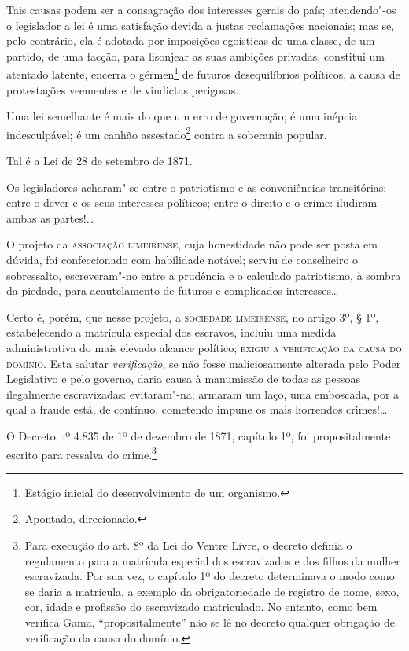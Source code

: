 Tais causas podem ser a consagração dos interesses gerais do país;
atendendo"-os o legislador a lei é uma satisfação devida a justas
reclamações nacionais; mas se, pelo contrário, ela é adotada por
imposições egoísticas de uma classe, de um partido, de uma facção, para
lisonjear as suas ambições privadas, constitui um atentado latente,
encerra o gérmen\footnote{Estágio inicial do desenvolvimento de um
  organismo.} de futuros desequilíbrios políticos, a causa de
protestações veementes e de vindictas perigosas.

Uma lei semelhante é mais do que um erro de governação; é uma inépcia
indesculpável; é um canhão assestado\footnote{Apontado, direcionado.}
contra a soberania popular.

Tal é a Lei de 28 de setembro de 1871.

Os legisladores acharam"-se entre o patriotismo e as conveniências
transitórias; entre o dever e os seus interesses políticos; entre o
direito e o crime: iludiram ambas as partes!\ldots{}

O projeto da \textsc{associação limeirense}, cuja honestidade não pode ser posta
em dúvida, foi confeccionado com habilidade notável; serviu de
conselheiro o sobressalto, escreveram"-no entre a prudência e o calculado
patriotismo, à sombra da piedade, para acautelamento de futuros e
complicados interesses\ldots{}

Certo é, porém, que nesse projeto, a \textsc{sociedade limeirense}, no artigo 3º,
§ 1º, estabelecendo a matrícula especial dos escravos, incluiu uma
medida administrativa do mais elevado alcance político; \textsc{exigiu a
verificação da causa do domínio}. Esta salutar \emph{verificação}, se não
fosse maliciosamente alterada pelo Poder Legislativo e pelo governo,
daria causa à manumissão de todas as pessoas ilegalmente escravizadas:
evitaram"-na; armaram um laço, uma emboscada, por a qual a fraude está,
de contínuo, cometendo impune os mais horrendos crimes!\ldots{}

O Decreto nº 4.835 de 1º de dezembro de 1871, capítulo 1º, foi
propositalmente escrito para ressalva do crime.\footnote{Para execução
  do art. 8º da Lei do Ventre Livre, o decreto definia o regulamento
  para a matrícula especial dos escravizados e dos filhos da mulher
  escravizada. Por sua vez, o capítulo 1º do decreto determinava o modo
  como se daria a matrícula, a exemplo da obrigatoriedade de registro de
  nome, sexo, cor, idade e profissão do escravizado matriculado. No
  entanto, como bem verifica Gama, ``propositalmente'' não se lê no
  decreto qualquer obrigação de verificação da causa do domínio.}


